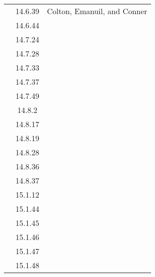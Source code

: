 \documentclass[12pt]{amsart}
\begin{document}
\begin{longtable}{c|c|l}
                        & 14.6.39                              & Colton, Emanuil, and Conner              \\
                        & 14.6.44                              &                                          \\
                        & 14.7.24                              &                                          \\
                        & 14.7.28                              &                                          \\
                        & 14.7.33                              &                                          \\
                        & 14.7.37                              &                                          \\
                        & 14.7.49                              &                                          \\
                        & 14.8.2                               &                                          \\
                        & 14.8.17                              &                                          \\
                        & 14.8.19                              &                                          \\
                        & 14.8.28                              &                                          \\
                        & 14.8.36                              &                                          \\
                        & 14.8.37                              &                                          \\
                        & 15.1.12                              &                                          \\
                        & 15.1.44                              &                                          \\
                        & 15.1.45                              &                                          \\
                        & 15.1.46                              &                                          \\
                        & 15.1.47                              &                                          \\
                        & 15.1.48                              &                                          
    \end{longtable}
\end{document}

